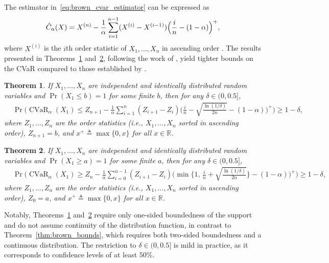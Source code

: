\documentclass[acmlarge, manuscript, screen, review, natbib=false, oneside]{acmart}
\newtheorem{theorem}{Theorem}[section]
\DeclareMathOperator{\CVaR}{CVaR}
\begin{document}
The estimator in~\eqref{eq:brown_cvar_estimator} can be expressed as
\begin{equation}\label{eq:cvar_estimator_sorted_sample}
	\hat{C}_\alpha(X)=X^{(n)}-\frac{1}{\alpha}\sum_{i=1}^{n-1} (X^{(i)}-X^{(i-1)})\Bigl{(} \frac{i}{n}-(1-\alpha) \Bigr{)}^+,
\end{equation}
where $X^{(i)}$ is the $i$th order statistic of $X_1,\dots,X_n$ in ascending order \cite{pmlr-v97-thomas19a}. The results presented in Theorems~\ref{thm:thomas_upper_bound} and~\ref{thm:thomas_lower_bound}, following the work of \cite{pmlr-v97-thomas19a}, yield tighter bounds on the CVaR compared to those established by \cite{brown2007large}.
\begin{theorem}\label{thm:thomas_upper_bound}
	If $X_1, \ldots, X_n$ are independent and identically distributed random variables and $\Pr(X_1 \le b) = 1$ for some finite $b$, then for any $\delta \in (0, 0.5]$,
	\begin{equation}
		\begin{aligned}
			&\Pr\Bigg(
			\CVaR_\alpha(X_1)
			\le Z_{n+1}
			- \frac{1}{\alpha} \sum_{i=1}^n (Z_{i+1} - Z_i) 
			\Bigg(
			\frac{i}{n} - \sqrt{\frac{\ln(1/\delta)}{2n}}
			- (1 - \alpha)\Bigg)^{+}
			\Bigg) \ge 1 - \delta,
		\end{aligned}
	\end{equation}
	where $Z_1, \ldots, Z_n$ are the order statistics (i.e., $X_1, \ldots, X_n$ sorted in ascending order), $Z_{n+1} = b$, and $x^+ \triangleq  \max\{0, x\}$ for all $x \in \mathbb{R}$.
\end{theorem}

\begin{theorem}\label{thm:thomas_lower_bound}
	If $X_1, \ldots, X_n$ are independent and identically distributed random variables and $\Pr(X_1 \ge a) = 1$ for some finite $a$, then for any $\delta \in (0, 0.5]$,
	\begin{equation}
		\begin{aligned}
			&\Pr\Bigg(
			\CVaR_\alpha(X_1)
			\ge Z_n
			- \frac{1}{\alpha} \sum_{i=0}^{n-1} (Z_{i+1} - Z_i)
			\Big(
			\min \Big\{
			1,\, \frac{i}{n} + \sqrt{\frac{\ln(1/\delta)}{2n}}
			\Big\}
			- (1 - \alpha) \Big)^{+}
			\Bigg) \ge 1 - \delta,
		\end{aligned}
	\end{equation}
	where $Z_1, \ldots, Z_n$ are the order statistics (i.e., $X_1, \ldots, X_n$ sorted in ascending order), $Z_0 = a$, and $x^+ \triangleq \max\{0, x\}$ for all $x \in \mathbb{R}$.
\end{theorem}
Notably, Theorems~\ref{thm:thomas_upper_bound} and~\ref{thm:thomas_lower_bound} require only one-sided boundedness of the support and do not assume continuity of the distribution function, in contrast to Theorem~\ref{thm:brown_bounds}, which requires both two-sided boundedness and a continuous distribution. The restriction to $\delta \in (0, 0.5]$ is mild in practice, as it corresponds to confidence levels of at least $50\%$.
\end{document}
